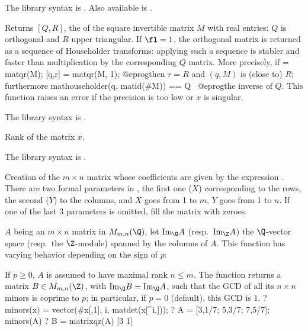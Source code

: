 The library syntax is .
Also available is .

\label{se:matqr}
Returns $[Q,R]$, the  of the square invertible
matrix $M$ with real entries: $Q$ is orthogonal and $R$ upper triangular. If
$\fl=1$, the orthogonal matrix is returned as a sequence of Householder
transforms: applying such a sequence is stabler and faster than
multiplication by the corresponding $Q$ matrix.
More precisely, if
\bprog
  [Q,R] = matqr(M);
  [q,r] = matqr(M, 1);
@eprog\noindent then $r = R$ and $(q, M)$ is
(close to) $R$; furthermore
\bprog
  mathouseholder(q, matid(#M)) == Q~
@eprog\noindent the inverse of $Q$. This function raises an error if the
precision is too low or $x$ is singular.

The library syntax is .

\label{se:matrank}
Rank of the matrix $x$.

The library syntax is .

\label{se:matrix}
Creation of the
$m\times n$ matrix whose coefficients are given by the expression
. There are two formal parameters in , the first one
($X$) corresponding to the rows, the second ($Y$) to the columns, and $X$
goes from 1 to $m$, $Y$ goes from 1 to $n$. If one of the last 3 parameters
is omitted, fill the matrix with zeroes.

\label{se:matrixqz}
$A$ being an $m\times n$ matrix in $M_{m,n}(\Q)$, let
$\text{Im}_\Q A$ (resp.~$\text{Im}_\Z A$) the $\Q$-vector space
(resp.~the $\Z$-module) spanned by the columns of $A$. This function has
varying behavior depending on the sign of $p$:

If $p \geq 0$, $A$ is assumed to have maximal rank $n\leq m$. The function
returns a matrix $B\in M_{m,n}(\Z)$, with $\text{Im}_\Q B = \text{Im}_\Q A$,
such that the GCD of all its $n\times n$ minors is coprime to
$p$; in particular, if $p = 0$ (default), this GCD is $1$.
\bprog
? minors(x) = vector(#x[,1], i, matdet(x[^i,]));
? A = [3,1/7; 5,3/7; 7,5/7]; minors(A)
? B = matrixqz(A)
[3 1]

